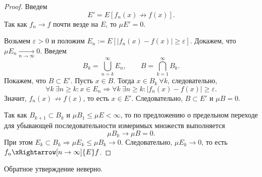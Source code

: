 \documentclass[12pt,a4paper]{report}
\begin{document}
\begin{proof}
    Введем
    \[
    E'=E[f_n(x)\not\to f(x)].
    \]
    Так как $f_n\to f$ почти везде на $E$, то $\mu E'=0$.

    Возьмем $\varepsilon>0$ и положим $E_n:=E[|f_n(x)-f(x)|\geq\varepsilon]$. Докажем, что $\mu E_n\xrightarrow[n\to\infty]{}0$. Введем
    \[
    B_k=\bigcup_{n=k}^{\infty}E_n, \qquad B=\bigcap_{k=1}^{\infty}B_k.
    \]
    Покажем, что $B\subset E'$. Пусть $x\in B$. Тогда $x\in B_k\ \forall k$, следовательно,
    \[
    \forall k\ \exists n\geq k\colon x\in E_n
    \Rightarrow
    \forall k\ \exists n\geq k\colon |f_n(x)-f(x)|\geq\varepsilon.
    \]
    Значит, $f_n(x)\not\to f(x)$, то есть $x\in E'$. Следовательно, $B\subset E'$ и $\mu B=0$.

    Так как $B_{k+1}\subset B_k$ и $\mu B_1\leq\mu E<\infty$, то по предложению о предельном переходе для убывающей последовательности измеримых множеств выполняется
    \[
    \mu B_k\to\mu B=0.
    \]
    При этом $E_k\subset B_k\Rightarrow\mu E_k\leq\mu B_k\to0$. Следовательно, $\mu E_k\to0$, то есть $f_n\xRightarrow[n\to\infty]{E}f$.
\end{proof}

Обратное утверждение неверно.
\end{document}
